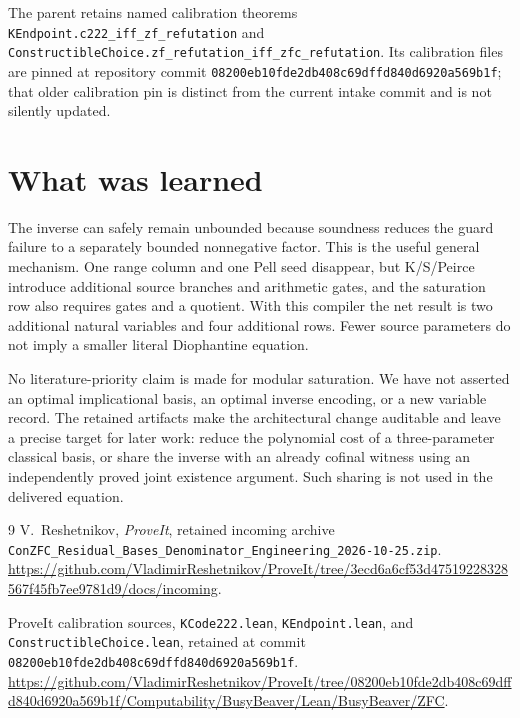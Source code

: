 \documentclass[11pt]{article}
\newcommand{\file}[1]{\texttt{\nolinkurl{#1}}}
\begin{document}
The parent retains named calibration theorems
\file{KEndpoint.c222_iff_zf_refutation} and
\file{ConstructibleChoice.zf_refutation_iff_zfc_refutation}.
Its calibration files are pinned at repository commit
\file{08200eb10fde2db408c69dffd840d6920a569b1f}; that older calibration
pin is distinct from the current intake commit and is not silently updated.

\section{What was learned}

The inverse can safely remain unbounded because soundness reduces the
guard failure to a separately bounded nonnegative factor. This is the
useful general mechanism. One range column and one Pell seed disappear,
but K/S/Peirce introduce additional source branches and arithmetic gates,
and the saturation row also requires gates and a quotient. With this
compiler the net result is two additional natural variables and four
additional rows. Fewer source parameters do not imply a smaller literal
Diophantine equation.

No literature-priority claim is made for modular saturation. We have not
asserted an optimal implicational basis, an optimal inverse encoding, or a
new variable record. The retained artifacts make the architectural change
auditable and leave a precise target for later work: reduce the polynomial
cost of a three-parameter classical basis, or share the inverse with an
already cofinal witness using an independently proved joint existence
argument. Such sharing is not used in the delivered equation.

\begin{thebibliography}{9}
V.~Reshetnikov, \emph{ProveIt}, retained incoming archive
\file{ConZFC_Residual_Bases_Denominator_Engineering_2026-10-25.zip}.
\url{https://github.com/VladimirReshetnikov/ProveIt/tree/3ecd6a6cf53d47519228328567f45fb7ee9781d9/docs/incoming}.

ProveIt calibration sources, \file{KCode222.lean},
\file{KEndpoint.lean}, and \file{ConstructibleChoice.lean}, retained
at commit \file{08200eb10fde2db408c69dffd840d6920a569b1f}.
\url{https://github.com/VladimirReshetnikov/ProveIt/tree/08200eb10fde2db408c69dffd840d6920a569b1f/Computability/BusyBeaver/Lean/BusyBeaver/ZFC}.
\end{thebibliography}
\end{document}
